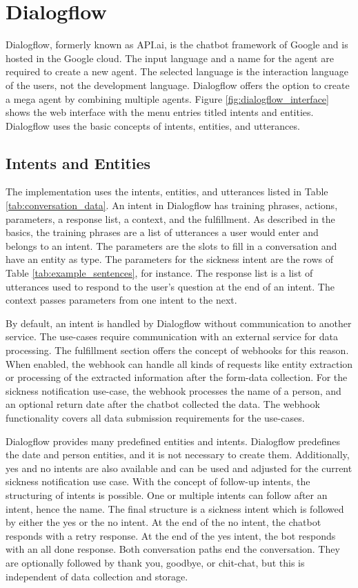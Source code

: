 \section{Dialogflow}
Dialogflow\cite{dialogflow}, formerly known as API.ai, is the chatbot framework of Google and is hosted in the Google cloud.
The input language and a name for the agent are required to create a new agent.
The selected language is the interaction language of the users, not the development language.
Dialogflow offers the option to create a mega agent by combining multiple agents.
Figure \ref{fig:dialogflow_interface} shows the web interface with the menu entries titled intents and entities.
Dialogflow uses the basic concepts of intents, entities, and utterances.

\subsection{Intents and Entities}
The implementation uses the intents, entities, and utterances listed in Table \ref{tab:conversation_data}.
An intent in Dialogflow has training phrases, actions, parameters,
a response list, a context, and the fulfillment.
As described in the basics, the training phrases are a list of utterances a user would enter and belongs to an intent.
The parameters are the slots to fill in a conversation and have an entity as type.
The parameters for the sickness intent are the rows of Table \ref{tab:example_sentences}, for instance.
The response list is a list of utterances used to respond to the user's question at the end of an intent.
The context passes parameters from one intent to the next.

By default, an intent is handled by Dialogflow without communication to another service.
The use-cases require communication with an external service for data processing.
The fulfillment section offers the concept of webhooks for this reason.
When enabled, the webhook can handle all kinds of requests like entity extraction or processing of the extracted information after the form-data collection.
For the sickness notification use-case, the webhook processes the name of a person, and an optional return date after the chatbot collected the data.
The webhook functionality covers all data submission requirements for the use-cases.

Dialogflow provides many predefined entities and intents.
Dialogflow predefines the date and person entities, and it is not necessary to create them.
Additionally, yes and no intents are also available and can be used and 
adjusted for the current sickness notification use case.
With the concept of follow-up intents, the structuring of intents is possible.
One or multiple intents can follow after an intent, hence the name.
The final structure is a sickness intent which is followed by either 
the yes or the no intent.
At the end of the no intent, the chatbot responds with a retry response.
At the end of the yes intent, the bot responds with an all done response.
Both conversation paths end the conversation.
They are optionally followed by thank you, goodbye, or chit-chat, but this is independent of data collection and storage. 

